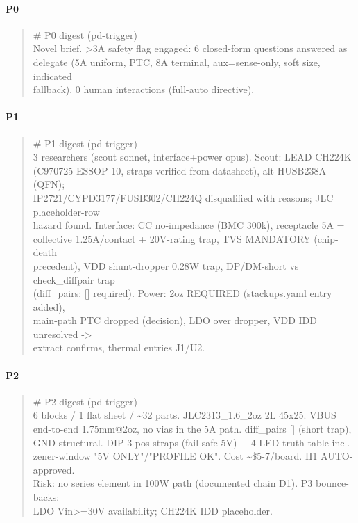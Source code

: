 \documentclass[11pt,a4paper]{article}
\begin{document}
\paragraph*{P0}
\begin{quote}\small\ttfamily\raggedright
\# P0 digest (pd-trigger)\\
Novel brief. \textgreater{}3A safety flag engaged: 6 closed-form questions answered as\\
delegate (5A uniform, PTC, 8A terminal, aux=sense-only, soft size, indicated\\
fallback). 0 human interactions (full-auto directive).
\end{quote}
\paragraph*{P1}
\begin{quote}\small\ttfamily\raggedright
\# P1 digest (pd-trigger)\\
3 researchers (scout sonnet, interface+power opus). Scout: LEAD CH224K\\
(C970725 ESSOP-10, straps verified from datasheet), alt HUSB238A (QFN);\\
IP2721/CYPD3177/FUSB302/CH224Q disqualified with reasons; JLC placeholder-row\\
hazard found. Interface: CC no-impedance (BMC 300k), receptacle 5A =\\
collective 1.25A/contact + 20V-rating trap, TVS MANDATORY (chip-death\\
precedent), VDD shunt-dropper 0.28W trap, DP/DM-short vs check\_diffpair trap\\
(diff\_pairs: {[}{]} required). Power: 2oz REQUIRED (stackups.yaml entry added),\\
main-path PTC dropped (decision), LDO over dropper, VDD IDD unresolved -\textgreater{}\\
extract confirms, thermal entries J1/U2.
\end{quote}
\paragraph*{P2}
\begin{quote}\small\ttfamily\raggedright
\# P2 digest (pd-trigger)\\
6 blocks / 1 flat sheet / \textasciitilde{}32 parts. JLC2313\_1.6\_2oz 2L 45x25. VBUS\\
end-to-end 1.75mm@2oz, no vias in the 5A path. diff\_pairs {[}{]} (short trap),\\
GND structural. DIP 3-pos straps (fail-safe 5V) + 4-LED truth table incl.\\
zener-window "5V ONLY"/"PROFILE OK". Cost \textasciitilde{}\$5-7/board. H1 AUTO-approved.\\
Risk: no series element in 100W path (documented chain D1). P3 bounce-backs:\\
LDO Vin\textgreater{}=30V availability; CH224K IDD placeholder.
\end{quote}
\end{document}
